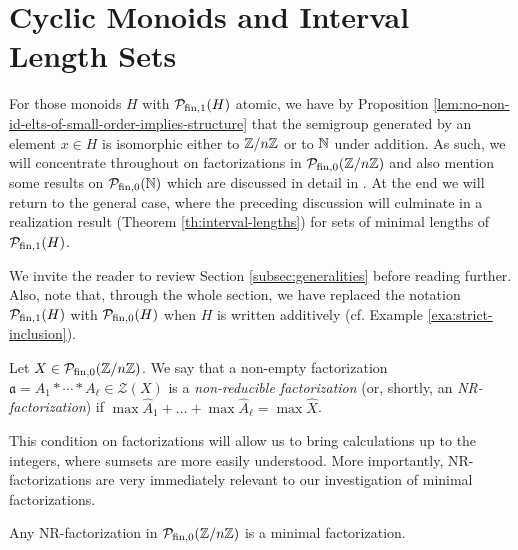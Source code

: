 \section{Cyclic Monoids and Interval Length Sets}
\label{sec:cyclic-case} 
For those monoids $H$ with $\mathcal{P}_{\textrm{fin}, 1}(H)$ atomic, we have by Proposition \ref{lem:no-non-id-elts-of-small-order-implies-structure} that the semigroup generated by an element $x\in H$ is isomorphic either to $\mathbb{Z}/n\mathbb{Z}$ or to $\mathbb{N}$ under addition.
As such, we will concentrate throughout on factorizations in $\mathcal{P}_{\textrm{fin},0}(\mathbb{Z}/n\mathbb{Z})$ and also mention some results on $\mathcal{P}_{\textrm{fin},0}(\mathbb{N})$ which are discussed in detail in \cite[Section 4]{fan-tringali18}.
At the end we will return to the general case, where the preceding discussion will culminate in a realization result (Theorem \ref{th:interval-lengths}) for sets of minimal lengths of $\mathcal{P}_{\textrm{fin}, 1}(H)$.

We invite the reader to review Section \ref{subsec:generalities} before reading further. Also, note that, through the whole section, we have replaced the notation $\mathcal{P}_{\textrm{fin}, 1}(H)$ with $\mathcal{P}_{\textrm{fin},0}(H)$ when $H$ is written additively (cf. Example \ref{exa:strict-inclusion}).


\begin{defn}\label{NR-factorization}
	Let $X \in \mathcal P_{\textrm{fin},0}(\mathbb{Z}/n\mathbb{Z})$. We say that a non-empty factorization $\mathfrak a = A_1 \ast \cdots \ast A_\ell \in \mathcal{Z}(X)$ is a \emph{non-reducible factorization} (or, shortly, an \emph{\textup{NR}-factorization}) if $ \max\hat{A}_1 + \dots + \max\hat{A}_\ell = \max \hat{X}$.
\end{defn}

This condition on factorizations will allow us to bring calculations up to the integers, where sumsets are more easily understood.
More importantly, NR-factorizations are very immediately relevant to our investigation of minimal factorizations.

\begin{lemma}\label{NR-factorizations-are-minimal}
Any \textup{NR}-factorization in $\mathcal{P}_{\textrm{fin},0}(\mathbb{Z}/n\mathbb{Z})$ is a minimal factorization.
\end{lemma}

